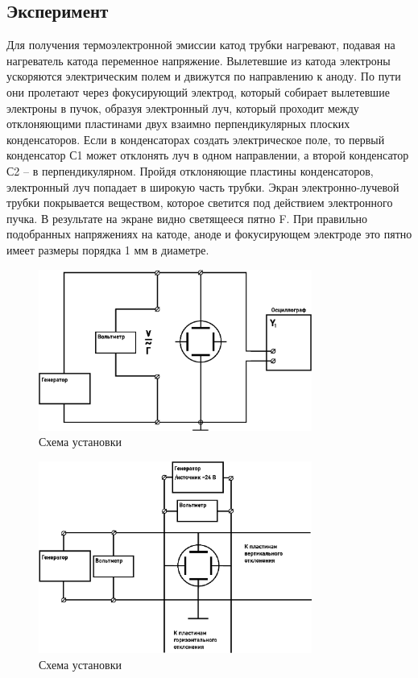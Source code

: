 \subsection{Эксперимент}
Для получения термоэлектронной эмиссии катод трубки нагревают, подавая на нагреватель катода переменное напряжение. Вылетевшие из катода электроны ускоряются электрическим полем и движутся по направлению к аноду. По пути они пролетают через фокусирующий электрод, который собирает вылетевшие электроны в пучок, образуя электронный луч, который проходит между отклоняющими пластинами двух взаимно перпендикулярных плоских конденсаторов. Если в конденсаторах создать электрическое поле, то первый конденсатор С1 может отклонять луч в одном направлении, а второй конденсатор С2 – в перпендикулярном. Пройдя отклоняющие пластины конденсаторов, электронный луч попадает в широкую часть трубки. Экран электронно-лучевой трубки покрывается веществом, которое светится под действием электронного пучка. В результате на экране видно светящееся пятно F. При правильно подобранных напряжениях на катоде, аноде и фокусирующем электроде это пятно имеет размеры порядка 1 мм в диаметре.

\begin{figure}[ht!]
\centering
\includegraphics[width=0.8\textwidth]{схема_1.eps}
\caption{Схема установки}
\label{fig:sketch}
\end{figure}
\clearpage
\begin{figure}[ht!]
\centering
\includegraphics[width=0.8\textwidth]{схема_2.eps}
\caption{Схема установки}
\label{fig:sketch}
\end{figure}

